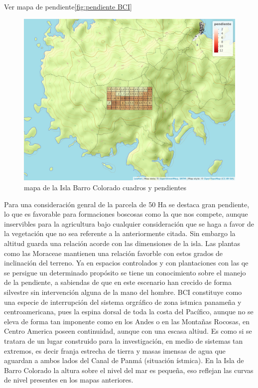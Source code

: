 \documentclass[11pt,]{article}
\begin{document}
Ver mapa de pendiente\ref{fig:pendiente BCI}

\begin{figure}
\centering
\includegraphics[width=1.00000\textwidth]{mapa_cuadros_pendiente.png}
\caption{mapa de la Isla Barro Colorado cuadros y pendientes
\label{fig:bci_map}}
\end{figure}

Para una consideración genral de la parcela de 50 Ha se destaca gran
pendiente, lo que es favorable para formaciones boscosas como la que nos
compete, aunque inservibles para la agricultura bajo cualquier
consideración que se haga a favor de la vegetación que no sea referente
a la anteriormente citada. Sin embargo la altitud guarda una relación
acorde con las dimensiones de la isla. Las plantas como las Moraceae
mantienen una relación favorble con estos grados de inclinación del
terreno. Ya en espacios controlados y con plantaciones con las qe se
persigue un determinado propósito se tiene un conocimiento sobre el
manejo de la pendiente, a sabiendas de que en este escenario han crecido
de forma silvestre sin intervención alguna de la mano del hombre. BCI
constituye como una especie de interrupción del sistema orgráfico de
zona istmica panameña y centroamericana, pues la espina dorsal de toda
la costa del Pacífico, aunque no se eleva de forma tan imponente como en
los Andes o en las Montañas Rocosas, en Centro America poseen
continuidad, aunque con una escasa altiud. Es como si se tratara de un
lugar construido para la investigación, en medio de sistemas tan
extremos, es decir franja estrecha de tierra y masas imensas de agua que
aguardan a ambos lados del Canal de Panmá (situación ístmica). En la
Isla de Barro Colorado la altura sobre el nivel del mar es pequeña, eso
reflejan las curvas de nivel presentes en los mapas anteriores.
\end{document}
